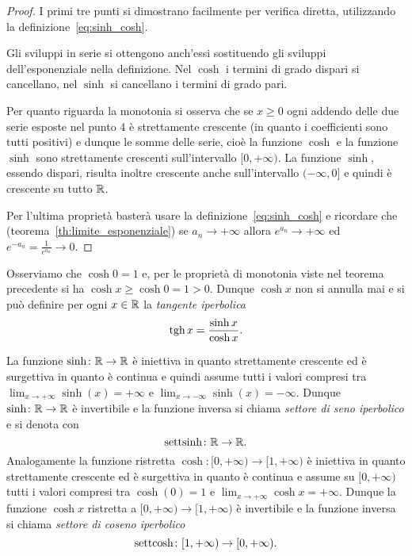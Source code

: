 %
\begin{proof}
I primi tre punti si dimostrano facilmente per verifica diretta,
utilizzando la definizione~\eqref{eq:sinh_cosh}.

Gli sviluppi in serie si ottengono anch'essi sostituendo
gli sviluppi dell'esponenziale nella definizione.
Nel $\cosh$ i termini di grado dispari si cancellano, nel $\sinh$ si cancellano
i termini di grado pari.

Per quanto riguarda la monotonia si osserva che se $x\ge 0$ ogni
addendo delle due serie esposte nel punto 4 è strettamente crescente
(in quanto i coefficienti sono tutti positivi) e dunque le somme delle serie,
cioè la funzione $\cosh$ e la funzione $\sinh$ sono strettamente crescenti
sull'intervallo $[0,+\infty)$. La funzione $\sinh$, essendo dispari,
risulta inoltre crescente anche sull'intervallo $(-\infty,0]$ e quindi
è crescente su tutto $\mathbb R$.

Per l'ultima proprietà basterà usare la definizione~\eqref{eq:sinh_cosh}
e ricordare che (teorema~\ref{th:limite_esponenziale})
se $a_n\to +\infty$ allora
$e^{a_n}\to +\infty$ ed $e^{-a_n}=\frac{1}{e^{a_n}} \to 0$.
\end{proof}

Osserviamo che $\cosh 0 = 1$ e, per le proprietà di monotonia viste nel teorema
precedente si ha $\cosh x \ge \cosh 0 = 1 > 0$. Dunque $\cosh x$ non si annulla
mai e si può definire per ogni $x\in \mathbb R$ la \emph{tangente iperbolica}
\mymargin{$\tgh$}
\[
 \operatorname{tgh} x = \frac{\sinh x}{\cosh x}.
\]

La funzione $\sinh\colon \mathbb R\to\mathbb R$ è iniettiva in quanto strettamente crescente ed
è surgettiva in quanto è continua e quindi assume tutti i valori compresi tra
$\lim_{x\to+\infty} \sinh(x) = +\infty$ e $\lim_{x\to -\infty} \sinh(x) = -\infty$. 
Dunque $\sinh\colon \mathbb R \to \mathbb R$
è invertibile e la funzione inversa si chiama \emph{settore di seno iperbolico}
e si denota con
\mymargin{$\settsinh$}
\[
  \operatorname{settsinh} \colon \mathbb R \to \mathbb R.
\]
Analogamente la funzione ristretta $\cosh\colon [0,+\infty)\to [1,+\infty)$ è
iniettiva in quanto strettamente crescente ed è surgettiva in quanto
è continua e assume su $[0,+\infty)$ tutti i valori compresi tra $\cosh(0)=1$ e
$\lim_{x\to +\infty} \cosh x = +\infty$.
Dunque la funzione $\cosh x$ ristretta a $[0,+\infty)\to [1,+\infty)$
è invertibile e la funzione inversa si chiama \emph{settore di coseno iperbolico}
\mymargin{$\settcosh$}
\[
 \operatorname{settcosh} \colon [1,+\infty)\to [0,+\infty).
\]

